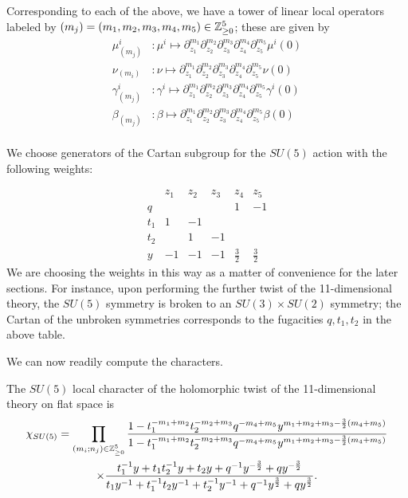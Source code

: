 Corresponding to each of the above, we have a tower of linear local operators labeled by $(m_j) = (m_1, m_2, m_3, m_4, m_5)\in \mathbb{Z}^5_{\geq 0}$; these are given by
\begin{align*}
 \mu^{i}_{(m_j)} &: \mu^{i}\mapsto \partial_{z_1}^{m_1}\partial_{z_2}^{m_2}\partial_{z_3}^{m_3}\partial_{z_4}^{m_4}\partial_{z_5}^{m_5}\mu^{i} (0) \\
\nu_{(m_i)} &: \nu\mapsto \partial_{z_1}^{m_1}\partial_{z_2}^{m_2}\partial_{z_3}^{m_3}\partial_{z_4}^{m_4}\partial_{z_5}^{m_5}\nu (0) \\
\gamma^{i}_{(m_j)} &: \gamma^{i}\mapsto \partial_{z_1}^{m_1}\partial_{z_2}^{m_2}\partial_{z_3}^{m_3}\partial_{z_4}^{m_4}\partial_{z_5}^{m_5}\gamma^{i} (0) \\
 \beta_{(m_j)} &: \beta\mapsto \partial_{z_1}^{m_1}\partial_{z_2}^{m_2}\partial_{z_3}^{m_3}\partial_{z_4}^{m_4}\partial_{z_5}^{m_5}\beta (0) \\
\end{align*}

We choose generators of the Cartan subgroup for the $SU(5)$ action with the following weights:

\[\begin{array}{|c|c|c|c|c|c|}
& z_1 & z_2 & z_3 & z_4 & z_5 \\
\hline
q & & & & 1 & -1 \\
t_1 & 1 & -1 & & & \\
t_2 & & 1 & -1 & & \\
y & -1 & -1 & -1 &\frac 3 2 & \frac 3 2
\end{array}\]
We are choosing the weights in this way as a matter of convenience for the later sections. 
For instance, upon performing the further twist of the 11-dimensional theory, the $SU(5)$ symmetry is broken to an $SU(3)\times SU(2)$ symmetry; the Cartan of the unbroken symmetries corresponds to the fugacities $q, t_1, t_2$ in the above table. 

We can now readily compute the characters.
\begin{prop}
The $SU(5)$ local character of the holomorphic twist of the 11-dimensional theory on flat space is
\begin{multline}
\chi_{SU(5)} = 
\prod_ {(m_i;n_j)\in \mathbb{Z}^5_{\geq 0}} \frac{1- t_1^{-m_1+m_2}t_2^{-m_2+m_3}q^{-m_4+m_5}y^{m_1+m_2+m_3-\frac 3 2 (m_4+m_5)}}{1- t_1^{-m_1+m_2}t_2^{-m_2+m_3}q^{-m_4+m_5}y^{m_1+m_2+m_3-\frac 3 2 (m_4+m_5)} }
\\ 
\times \frac{t_1^{-1}y + t_1t_2^{-1}y + t_2y + q^{-1}y^{-\frac 3 2} + qy^{-\frac 3 2}}{t_1y^{-1} + t_1^{-1}t_2y^{-1} + t_2^{-1}y^{-1} + q^{-1}y^{\frac 3 2} + qy^{\frac 3 2}}.
\end{multline}
\end{prop}

